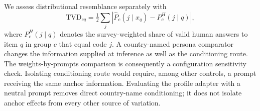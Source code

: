 We assess distributional resemblance separately with
\begin{equation}
\mathrm{TVD}_{cq}=\tfrac12\sum_j|\widehat P_c(j\mid x_q)-P_c^{H}(j\mid q)|,
\end{equation}
where $P_c^{H}(j\mid q)$ denotes the survey-weighted share of valid human answers to item $q$ in group $c$ that equal code $j$. A country-named persona comparator changes the information supplied at inference as well as the conditioning route. The weights-by-prompts comparison is consequently a configuration sensitivity check. Isolating conditioning route would require, among other controls, a prompt receiving the same anchor information. Evaluating the profile adapter with a neutral prompt removes direct country-name conditioning; it does not isolate anchor effects from every other source of variation.
